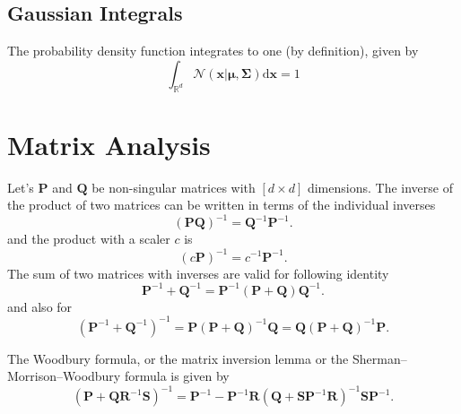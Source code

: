 \subsection{Gaussian Integrals}
The probability density function integrates to one (by definition), given by
\begin{equation}\label{eq:gaussian_int}
	\int_{\mathbb{R}^d}\mathcal{N}\left(\textbf{x}|\boldsymbol{\mu},\boldsymbol{\Sigma}\right)\text{d}\textbf{x}=1
\end{equation}

\section{Matrix Analysis}
Let's $\textbf{P}$ and $\textbf{Q}$ be non-singular matrices with $\left[d\times d\right]$ dimensions. The inverse of the product of two matrices can be written in terms of the individual inverses
\begin{equation}\label{eq:indv_invVec}
	\left(\textbf{P}\textbf{Q}\right)^{-1}=\textbf{Q}^{-1}\textbf{P}^{-1}.
\end{equation}
and the product with a scaler $c$ is
\begin{equation}\label{eq:indv_invVec}
	\left(c\textbf{P}\right)^{-1}=c^{-1}\textbf{P}^{-1}. 
\end{equation}
The sum of two matrices with inverses are valid for following identity
\begin{equation}\label{eq:inv_matsum1}
	\textbf{P}^{-1}+\textbf{Q}^{-1}=\textbf{P}^{-1}\left(\textbf{P}+\textbf{Q}\right)\textbf{Q}^{-1}.
\end{equation}
and also for 
\begin{equation}\label{eq:inv_matsum2}
	\left(\textbf{P}^{-1}+\textbf{Q}^{-1}\right)^{-1}=\textbf{P}\left(\textbf{P}+\textbf{Q}\right)^{-1}\textbf{Q}=\textbf{Q}\left(\textbf{P}+\textbf{Q}\right)^{-1}\textbf{P}.
\end{equation}

The Woodbury formula, or the matrix inversion lemma  or the Sherman–Morrison–Woodbury formula is given by
\begin{equation}\label{eq:Woodbury}
	\left(\textbf{P}+\textbf{Q}\textbf{R}^{-1}\textbf{S}\right)^{-1}=\textbf{P}^{-1}-\textbf{P}^{-1}\textbf{R}\left(\textbf{Q}+\textbf{S}\textbf{P}^{-1}\textbf{R}\right)^{-1}\textbf{S}\textbf{P}^{-1}.
\end{equation}

